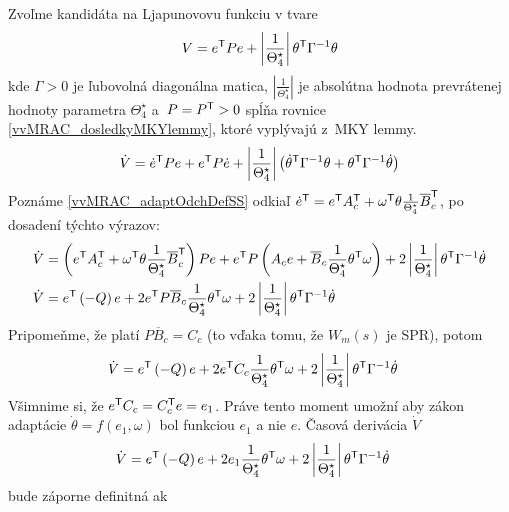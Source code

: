 ﻿\documentclass[a4paper, 10pt, ]{article}
\begin{document}
Zvoľme kandidáta na Ljapunovovu funkciu v tvare
\begin{equation}
	V = e^{\mathsf{T}} P e + \left| \frac{1}{\Theta_4^\star} \right| \theta^{\mathsf{T}} \Gamma^{-1} \theta
\end{equation}
kde $\Gamma > 0$ je ľubovolná diagonálna matica, $\left| \frac{1}{\Theta_4^\star} \right|$ je absolútna hodnota prevrátenej hodnoty parametra $\Theta_4^\star$ a~$P = P^{\mathsf{T}}>0$ spĺňa rovnice \eqref{vvMRAC_dosledkyMKYlemmy}, ktoré vyplývajú z~MKY lemmy.
\begin{equation}
	\dot{V} = \dot{e}^{\mathsf{T}} P e + e^{\mathsf{T}} P \dot{e} + \left| \frac{1}{\Theta_4^\star} \right| \left( \dot{\theta}^{\mathsf{T}} \Gamma^{-1} \theta + \theta^{\mathsf{T}} \Gamma^{-1} \dot{\theta} \right)
\end{equation}
Poznáme \eqref{vvMRAC_adaptOdchDefSS} odkiaľ $ \dot{e}^{\mathsf{T}} = e^{\mathsf{T}} A_c^{\mathsf{T}} + \omega^{\mathsf{T}} \theta \frac{1}{\Theta_4^\star} \overline{B}_c^{\mathsf{T}} $, po dosadení týchto výrazov:
\begin{align}
	\dot{V} &= \left( e^{\mathsf{T}} A_c^{\mathsf{T}} + \omega^{\mathsf{T}} \theta \frac{1}{\Theta_4^\star} \overline{B}_c^{\mathsf{T}} \right) P e  + e^{\mathsf{T}} P \left( A_c  e + \overline{B}_c \frac{1}{\Theta_4^\star} \theta^{\mathsf{T}} \omega \right) +  2 \left| \frac{1}{\Theta_4^\star} \right| \theta^{\mathsf{T}} \Gamma^{-1} \dot{\theta} \\
	\dot{V} &= e^{\mathsf{T}} \left( - Q \right) e + 2 e^{\mathsf{T}} P \overline{B}_c \frac{1}{\Theta_4^\star} \theta^{\mathsf{T}} \omega + 2 \left| \frac{1}{\Theta_4^\star} \right| \theta^{\mathsf{T}} \Gamma^{-1} \dot{\theta}
\end{align}
Pripomeňme, že platí $P \overline{B}_c = {C_c}$ (to vďaka tomu, že $W_m(s)$ je SPR), potom
\begin{align}
	\dot{V} &= e^{\mathsf{T}} \left( - Q \right) e + 2 e^{\mathsf{T}} C_c \frac{1}{\Theta_4^\star} \theta^{\mathsf{T}} \omega + 2 \left| \frac{1}{\Theta_4^\star} \right| \theta^{\mathsf{T}} \Gamma^{-1} \dot{\theta}
\end{align}
Všimnime si, že $e^{\mathsf{T}} C_c = C_c^{\mathsf{T}} e = e_1$. Práve tento moment umožní aby zákon adaptácie $\dot{\theta} = f(e_1, \omega)$ bol funkciou $e_1$ a nie $e$. Časová derivácia $\dot{V}$
\begin{align}
	\dot{V} &= e^{\mathsf{T}} \left( - Q \right) e + 2 e_1 \frac{1}{\Theta_4^\star} \theta^{\mathsf{T}} \omega + 2 \left| \frac{1}{\Theta_4^\star} \right| \theta^{\mathsf{T}} \Gamma^{-1} \dot{\theta}
\end{align}
bude záporne definitná ak
\end{document}
